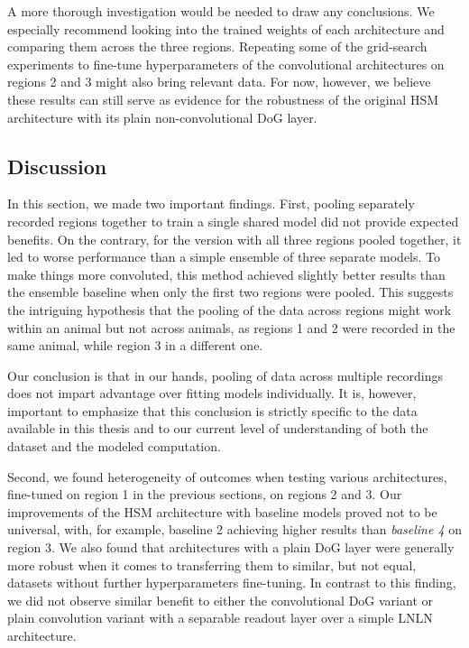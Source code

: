 A more thorough investigation would be needed to draw any conclusions. We especially recommend looking into the trained weights of each architecture and comparing them across the three regions. Repeating some of the grid-search experiments to fine-tune hyperparameters of the convolutional architectures on regions 2 and 3 might also bring relevant data. For now, however, we believe these results can still serve as evidence for the robustness of the original HSM architecture with its plain non-convolutional DoG layer.

\subsection{Discussion}

In this section, we made two important findings. First, pooling separately record\-ed regions together to train a single shared model did not provide expected benefits. On the contrary, for the version with all three regions pooled together, it led to worse performance than a simple ensemble of three separate models. To make things more convoluted, this method achieved slightly better results than the ensemble baseline when only the first two regions were pooled. 
This suggests the intriguing hypothesis that the pooling of the data across regions might work within an animal but not across animals, as regions 1 and 2 were recorded in the same animal, while region 3 in a different one. 

Our conclusion is that in our hands, pooling of data across multiple recordings does not impart advantage over fitting models individually. It is, however, important to emphasize that this conclusion is strictly specific to the data available in this thesis and to our current level of understanding of both the dataset and the modeled computation.

Second, we found heterogeneity of outcomes when testing various architectures, fine-tuned on region 1 in the previous sections, on regions 2 and 3. Our improvements of the HSM architecture with baseline models proved not to be universal, with, for example, baseline 2 achieving higher results than \textit{baseline 4} on region 3. We also found that architectures with a plain DoG layer were generally more robust when it comes to transferring them to similar, but not equal, datasets without further hyperparameters fine-tuning. In contrast to this finding, we did not observe similar benefit to either the convolutional DoG variant or plain convolution variant with a separable readout layer over a simple LNLN architecture.
